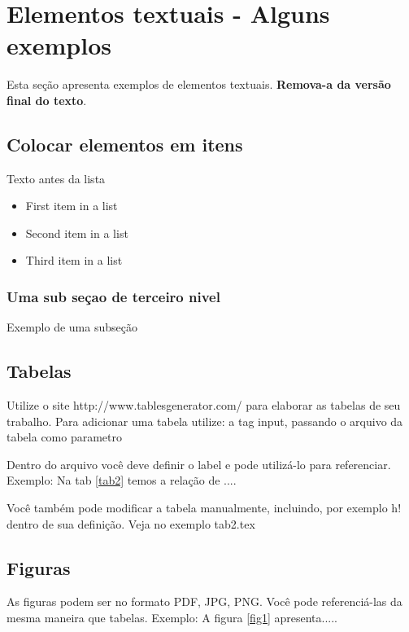 \documentclass[	DIV=calc,%
							paper=a4,%
							fontsize=12pt,%
							onecolumn]{scrartcl}	 					%
\begin{document}
\section{Elementos textuais - Alguns exemplos}

Esta seção apresenta exemplos de elementos textuais. \textbf{Remova-a da versão final do texto}.


\subsection{Colocar elementos em itens}

Texto antes da lista

\begin{itemize}
	\item First item in a list 
	\item Second item in a list 
	\item Third item in a list
\end{itemize}

\subsubsection{Uma sub seçao de terceiro nivel}

Exemplo de uma subseção

\subsection{Tabelas}

Utilize o site http://www.tablesgenerator.com/ para elaborar as tabelas de seu trabalho.
Para adicionar uma tabela utilize: a tag input, passando o arquivo da tabela como parametro



Dentro do arquivo você deve definir o label e pode utilizá-lo para referenciar. Exemplo:
Na tab \ref{tab2} temos a relação de ....


Você também pode modificar a tabela manualmente, incluindo, por exemplo h! dentro de sua definição. Veja no exemplo tab2.tex

\subsection{Figuras}

As figuras podem ser no formato PDF, JPG, PNG. Você pode referenciá-las da mesma maneira que tabelas. Exemplo: A figura \ref{fig1} apresenta.....
\end{document}

